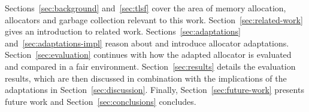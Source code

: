 
Sections~\ref{sec:background} and~\ref{sec:tlsf} cover the area of memory allocation, allocators and garbage collection relevant to this work. Section~\ref{sec:related-work} gives an introduction to related work. Sections~\ref{sec:adaptations} and~\ref{sec:adaptations-impl} reason about and introduce allocator adaptations. Section~\ref{sec:evaluation} continues with how the adapted allocator is evaluated and compared in a fair environment. Section~\ref{sec:results} details the evaluation results, which are then discussed in combination with the implications of the adaptations in Section~\ref{sec:discussion}. Finally, Section~\ref{sec:future-work} presents future work and Section~\ref{sec:conclusions} concludes.

